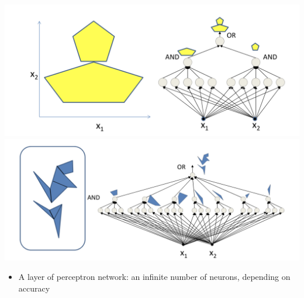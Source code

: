 \documentclass{article}
\begin{document}
	\includegraphics[scale=0.2]{24.png}
	\includegraphics[scale=0.2]{25.png}
	
	\begin{itemize}
		\item A layer of perceptron network: an infinite number of neurons, depending on accuracy
	\end{itemize}
	
\end{document}
